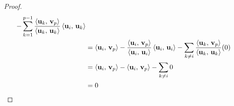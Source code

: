 \documentclass{ximera}
\begin{document}
\begin{theorem}
\begin{proof}
\begin{align*}
                                             -
                                             \sum_{k=1}^{p-1}\frac{\innerproduct{\vect{u}_k}{\vect{v}_p}}{\innerproduct{\vect{u}_k}{\vect{u}_k}}\innerproduct{\vect{u}_i}{\vect{u}_k}
      \\ %
                                           &=
                                             \innerproduct{\vect{u}_i}{\vect{v}_p}
                                             -
                                             \frac{\innerproduct{\vect{u}_i}{\vect{v}_p}}{\innerproduct{\vect{u}_i}{\vect{u}_i}}\innerproduct{\vect{u}_i}{\vect{u}_i}
                                             -
                                             \sum_{k\neq i}\frac{\innerproduct{\vect{u}_k}{\vect{v}_p}}{\innerproduct{\vect{u}_k}{\vect{u}_k}}(0)
\\ %
                                           &=
                                             \innerproduct{\vect{u}_i}{\vect{v}_p}
                                             -
                                             \innerproduct{\vect{u}_i}{\vect{v}_p}
                                             -
                                             \sum_{k\neq i}0\\
                                           &=0
    \end{align*}
    
  \end{proof}
\end{theorem}
\end{document}
